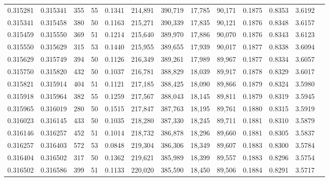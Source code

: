 \begin{tabular}{rrrrrrrrrrrrr}
0.315281 & 0.315341 &   355 &  55 &                                     0.1341 & 214,891 & 390,719 &  17,785 &  90,171 & 0.1875 & 0.8353 & 3.6192 \\
0.315341 & 0.315458 &   380 &  50 &                                     0.1163 & 215,271 & 390,339 &  17,835 &  90,121 & 0.1876 & 0.8348 & 3.6157 \\
0.315459 & 0.315550 &   369 &  51 &                                     0.1214 & 215,640 & 389,970 &  17,886 &  90,070 & 0.1876 & 0.8343 & 3.6123 \\
0.315550 & 0.315629 &   315 &  53 &                                     0.1440 & 215,955 & 389,655 &  17,939 &  90,017 & 0.1877 & 0.8338 & 3.6094 \\
0.315629 & 0.315749 &   394 &  50 &                                     0.1126 & 216,349 & 389,261 &  17,989 &  89,967 & 0.1877 & 0.8334 & 3.6057 \\
0.315750 & 0.315820 &   432 &  50 &                                     0.1037 & 216,781 & 388,829 &  18,039 &  89,917 & 0.1878 & 0.8329 & 3.6017 \\
0.315821 & 0.315914 &   404 &  51 &                                     0.1121 & 217,185 & 388,425 &  18,090 &  89,866 & 0.1879 & 0.8324 & 3.5980 \\
0.315918 & 0.315964 &   382 &  55 &                                     0.1259 & 217,567 & 388,043 &  18,145 &  89,811 & 0.1879 & 0.8319 & 3.5945 \\
0.315965 & 0.316019 &   280 &  50 &                                     0.1515 & 217,847 & 387,763 &  18,195 &  89,761 & 0.1880 & 0.8315 & 3.5919 \\
0.316023 & 0.316145 &   433 &  50 &                                     0.1035 & 218,280 & 387,330 &  18,245 &  89,711 & 0.1881 & 0.8310 & 3.5879 \\
0.316146 & 0.316257 &   452 &  51 &                                     0.1014 & 218,732 & 386,878 &  18,296 &  89,660 & 0.1881 & 0.8305 & 3.5837 \\
0.316257 & 0.316403 &   572 &  53 &                                     0.0848 & 219,304 & 386,306 &  18,349 &  89,607 & 0.1883 & 0.8300 & 3.5784 \\
0.316404 & 0.316502 &   317 &  50 &                                     0.1362 & 219,621 & 385,989 &  18,399 &  89,557 & 0.1883 & 0.8296 & 3.5754 \\
0.316502 & 0.316586 &   399 &  51 &                                     0.1133 & 220,020 & 385,590 &  18,450 &  89,506 & 0.1884 & 0.8291 & 3.5717 \\

\end{tabular}
